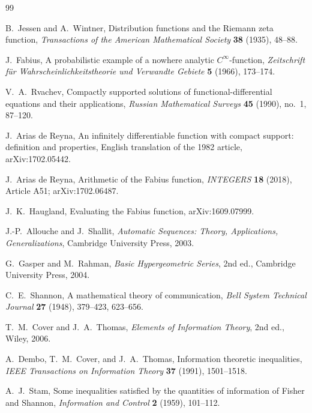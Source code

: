 \documentclass[11pt,oneside]{article}
\theoremstyle{definition}
\theoremstyle{remark}
\begin{document}
\begin{thebibliography}{99}

B.~Jessen and A.~Wintner,
\newblock Distribution functions and the Riemann zeta function,
\newblock \emph{Transactions of the American Mathematical Society} \textbf{38}
(1935), 48--88.

J.~Fabius,
\newblock A probabilistic example of a nowhere analytic $C^\infty$-function,
\newblock \emph{Zeitschrift f\"ur Wahrscheinlichkeitstheorie und Verwandte
Gebiete} \textbf{5} (1966), 173--174.

V.~A.~Rvachev,
\newblock Compactly supported solutions of functional-differential equations and
their applications,
\newblock \emph{Russian Mathematical Surveys} \textbf{45} (1990), no.~1,
87--120.

J.~Arias de Reyna,
\newblock An infinitely differentiable function with compact support: definition
and properties,
\newblock English translation of the 1982 article, arXiv:1702.05442.

J.~Arias de Reyna,
\newblock Arithmetic of the Fabius function,
\newblock \emph{INTEGERS} \textbf{18} (2018), Article A51;
arXiv:1702.06487.

J.~K.~Haugland,
\newblock Evaluating the Fabius function,
\newblock arXiv:1609.07999.

J.-P.~Allouche and J.~Shallit,
\newblock \emph{Automatic Sequences: Theory, Applications, Generalizations},
\newblock Cambridge University Press, 2003.

G.~Gasper and M.~Rahman,
\newblock \emph{Basic Hypergeometric Series}, 2nd ed.,
\newblock Cambridge University Press, 2004.

C.~E.~Shannon,
\newblock A mathematical theory of communication,
\newblock \emph{Bell System Technical Journal} \textbf{27} (1948), 379--423,
623--656.

T.~M.~Cover and J.~A.~Thomas,
\newblock \emph{Elements of Information Theory}, 2nd ed.,
\newblock Wiley, 2006.

A.~Dembo, T.~M.~Cover, and J.~A.~Thomas,
\newblock Information theoretic inequalities,
\newblock \emph{IEEE Transactions on Information Theory} \textbf{37} (1991),
1501--1518.

A.~J.~Stam,
\newblock Some inequalities satisfied by the quantities of information of Fisher
and Shannon,
\newblock \emph{Information and Control} \textbf{2} (1959), 101--112.


\end{thebibliography}
\end{document}
